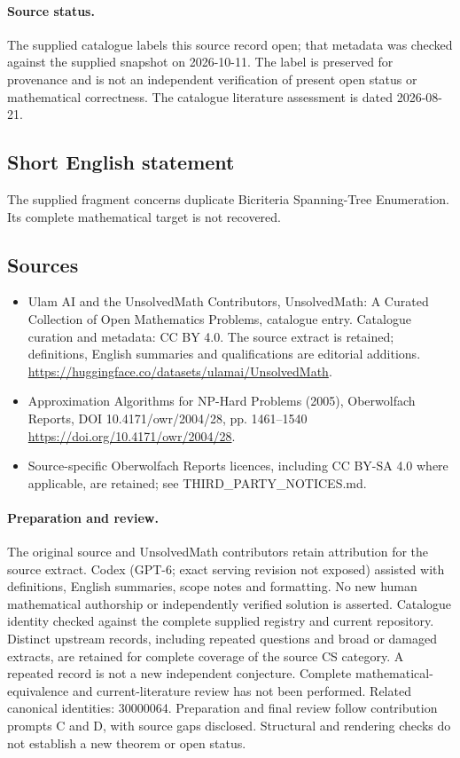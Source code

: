 \documentclass[11pt]{article}
\begin{document}
\paragraph{Source status.}
The supplied catalogue labels this source record open; that metadata was checked against the supplied snapshot on 2026-10-11. The label is preserved for provenance and is not an independent verification of present open status or mathematical correctness. The catalogue literature assessment is dated 2026-08-21.
\subsection{Short English statement}
The supplied fragment concerns duplicate Bicriteria Spanning-Tree Enumeration. Its complete mathematical target is not recovered.
\subsection{Sources}
\begin{itemize}
\item[\hypertarget{source:statement:1}{S1}] Ulam AI and the UnsolvedMath Contributors, UnsolvedMath: A Curated Collection of Open Mathematics Problems, catalogue entry. Catalogue curation and metadata: CC BY 4.0. The source extract is retained; definitions, English summaries and qualifications are editorial additions.
\url{https://huggingface.co/datasets/ulamai/UnsolvedMath}.
\item[\hypertarget{source:statement:2}{S2}] Approximation Algorithms for NP-Hard Problems (2005), Oberwolfach Reports, DOI 10.4171/owr/2004/28, pp. 1461--1540
\url{https://doi.org/10.4171/owr/2004/28}.
\item Source-specific Oberwolfach Reports licences, including CC BY-SA 4.0 where applicable, are retained; see THIRD\_PARTY\_NOTICES.md.
\end{itemize}
\paragraph{Preparation and review.}
The original source and UnsolvedMath contributors retain attribution for the source extract. Codex (GPT-6; exact serving revision not exposed) assisted with definitions, English summaries, scope notes and formatting. No new human mathematical authorship or independently verified solution is asserted. Catalogue identity checked against the complete supplied registry and current repository. Distinct upstream records, including repeated questions and broad or damaged extracts, are retained for complete coverage of the source CS category. A repeated record is not a new independent conjecture. Complete mathematical-equivalence and current-literature review has not been performed. Related canonical identities: 30000064. Preparation and final review follow contribution prompts C and D, with source gaps disclosed. Structural and rendering checks do not establish a new theorem or open status.
\label{end:statement}
\end{document}
